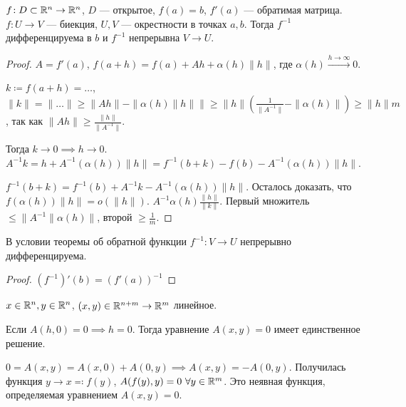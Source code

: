 \begin{theorem}
    $f\!: D \subset \mathbb{R}^n \to \mathbb{R}^n$, $D$ --- открытое,  $f(a) = b$,  $f'(a)$ --- обратимая матрица.  $f\!: U \to V$ ---  биекция,  $U, V$ --- окрестности в точках  $a, b$. Тогда  $f^{-1}$ дифференцируема в  $b$ и  $f^{-1}$ непрерывна  $V \to U$.
\end{theorem}
\begin{proof}
    $A = f'(a)$,  $f(a+h) = f(a) + Ah + \alpha(h) \|h\|$, где  $\alpha(h) \xrightarrow{h \to \infty} 0$.

    $k \coloneqq f(a+h) = \ldots$, $\|k\| = \|\ldots\| \ge \|Ah\| - \|\alpha(h)\|h\|\| \ge \|h\|(\frac{1}{\|A^{-1}\|} - \|\alpha(h)\|) \ge \|h\|m$, так как $\|Ah\| \ge \frac{\|h\|}{\|A^{-1}\|}$.

    Тогда $k \to 0 \implies h \to 0$.  $A^{-1}k = h + A^{-1}(\alpha(h))\|h\| = f^{-1}(b+k) - f(b) - A^{-1}(\alpha(h))\|h\|$.

    $f^{-1}(b+k) = f^{-1}(b) + A^{-1}k - A^{-1}(\alpha(h)) \|h\|$. Осталось доказать, что  $f(\alpha(h))\|h\| = o(\|h\|)$. $A^{-1}\alpha(h) \frac{\|h\|}{\|k\|}$. Первый множитель $\le \|A^{-1}\|\alpha(h)\|$, второй $\ge \frac{1}{m}$.
\end{proof}
\begin{consequence}
    В условии теоремы об обратной функции $f^{-1}\!: V \to U$ непрерывно дифференцируема.
\end{consequence}
\begin{proof}
    $(f^{-1})'(b) = (f'(a))^{-1}$
\end{proof}
$x \in \mathbb{R}^n, y \in \mathbb{R}^n$,  $(x, y) \in \mathbb{R}^{n+m} \to \mathbb{R}^m$ линейное.

Если  $A(h, 0) = 0 \implies h = 0$. Тогда уравнение  $A(x, y) = 0$ имеет единственное решение.

$0 = A(x, y) = A(x, 0) + A(0, y) \implies A(x, y) = -A(0, y)$. Получилась функция  $y \to x \eqqcolon f(y)$,  $A(f(y), y) = 0\ \forall y \in \mathbb{R}^m$. Это неявная функция, определяемая уравнением  $A(x, y) = 0$.

